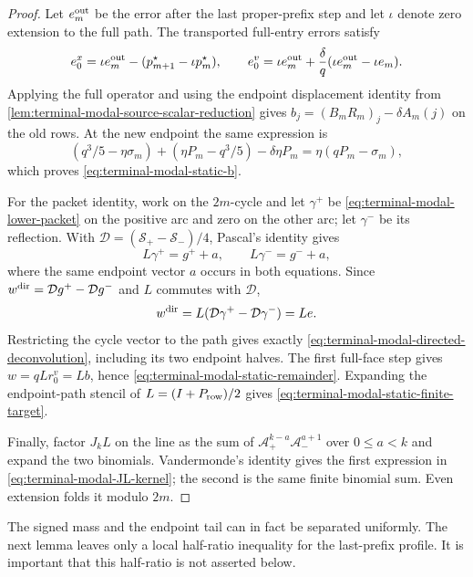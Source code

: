 \begin{proof}
Let $e_m^{\rm out}$ be the error after the last proper-prefix step and let
$\iota$ denote zero extension to the full path.  The transported full-entry
errors satisfy
\[
 e_0^x=\iota e_m^{\rm out}
 -(p_{m+1}^\star-\iota p_m^\star),\qquad
 e_0^v=\iota e_m^{\rm out}
 +\frac\delta q(\iota e_m^{\rm out}-\iota e_m).
\]
Applying the full operator and using the endpoint displacement identity from
\cref{lem:terminal-modal-source-scalar-reduction} gives
$b_j=(B_mR_m)_j-\delta A_m(j)$ on the old rows.  At the new endpoint the
same expression is
\[
 (q^3/5-\eta\sigma_m)+(\eta P_m-q^3/5)-\delta\eta P_m
 =\eta(qP_m-\sigma_m),
\]
which proves \eqref{eq:terminal-modal-static-b}.

For the packet identity, work on the $2m$-cycle and let $\gamma^+$ be
\eqref{eq:terminal-modal-lower-packet} on the positive arc and zero on the
other arc; let $\gamma^-$ be its reflection.  With
$\mathcal D=(\mathcal S_+-\mathcal S_-)/4$, Pascal's identity gives
\[
 L\gamma^+=g^++a,\qquad L\gamma^-=g^-+a,
\]
where the same endpoint vector $a$ occurs in both equations.  Since
$w^{\rm dir}=\mathcal Dg^+-\mathcal Dg^-$ and $L$ commutes with
$\mathcal D$,
\[
 w^{\rm dir}=L(\mathcal D\gamma^+-\mathcal D\gamma^-)=Le.
\]
Restricting the cycle vector to the path gives exactly
\eqref{eq:terminal-modal-directed-deconvolution}, including its two endpoint
halves.  The first full-face step gives $w=qLr_0^v=Lb$, hence
\eqref{eq:terminal-modal-static-remainder}.  Expanding the endpoint-path
stencil of $L=(I+P_{\rm row})/2$ gives
\eqref{eq:terminal-modal-static-finite-target}.

Finally, factor $J_kL$ on the line as the sum of
$\mathcal A_+^{k-a}\mathcal A_-^{a+1}$ over $0\le a<k$ and expand the two
binomials.  Vandermonde's identity gives the first expression in
\eqref{eq:terminal-modal-JL-kernel}; the second is the same finite binomial
sum.  Even extension folds it modulo $2m$.
\end{proof}

The signed mass and the endpoint tail can in fact be separated uniformly.
The next lemma leaves only a local half-ratio inequality for the last-prefix
profile.  It is important that this half-ratio is not asserted below.

